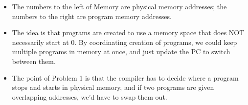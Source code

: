 \begin{frame}[fragile]
\BNotes\ifnum{}
\begin{itemize}
\item The numbers to the left of Memory are physical memory addresses;
	the numbers to the right are program memory addresses.
\item The idea is that programs are created to use a memory space that
	does NOT necessarily start at 0.  By coordinating creation
	of programs, we could keep multiple programs in memory at
	once, and just update the PC to switch between them.
\item The point of Problem 1 is that the compiler has to decide where a
	program stops and starts in physical memory, and if two programs
	are given overlapping addresses, we'd have to swap them out.
\end{itemize}
\fi\ENotes
\end{frame}


